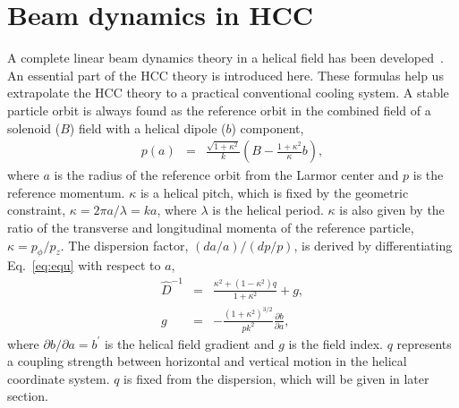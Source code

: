 \documentclass[11pt]{article}
\begin{document}
\section{Beam dynamics in HCC}
A complete linear beam dynamics theory in a helical field has been developed~\cite{Slava05}. 
An essential part of the HCC theory is introduced here. 
These formulas help us extrapolate the HCC theory to a practical conventional cooling system.
A stable particle orbit is always found as the reference orbit in the combined field of a solenoid ($B$) field with a helical dipole ($b$) component, 
\begin{eqnarray}
    p(a)&=&\frac{\sqrt{1+\kappa^2}}{k}\left( B-\frac{1+\kappa^2}{\kappa} b \right),
    \label{eq:equ}
\end{eqnarray}
where $a$ is the radius of the reference orbit from the Larmor center and $p$ is the reference momentum.
$\kappa$ is a helical pitch, which is fixed by the geometric constraint, $\kappa = 2\pi a/\lambda = ka$, where $\lambda$ is the helical period. 
$\kappa$ is also given by the ratio of the transverse and longitudinal momenta of the reference particle, $\kappa = p_\phi/p_z$. 
The dispersion factor, $(da/a)/(dp/p)$, is derived by differentiating Eq.~\eqref{eq:equ} with respect to $a$, 
\begin{eqnarray}
    \hat{D}^{-1} &=& \frac{\kappa^2 + (1-\kappa^2)q}{1+\kappa^2}+g, \label{usss} \\
    g &=&-\frac{(1+\kappa^2)^{3/2}}{pk^2}\frac{\partial b}{\partial a}, \label{eq:g}
\end{eqnarray}
where $\partial b/\partial a=b^\prime$ is the helical field gradient and $g$ is the field index. $q$ represents a coupling strength between horizontal and vertical motion in the helical coordinate system. $q$ is fixed from the dispersion, which will be given in later section. 
\end{document}
